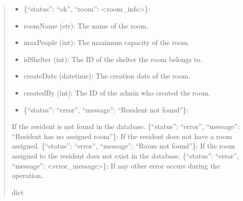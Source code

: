 \documentclass[letterpaper,10pt,english]{sphinxmanual}
\begin{document}
\begin{fulllineitems}
\begin{fulllineitems}
\begin{quote}
\begin{description}
\begin{itemize}
\end{itemize}

\sphinxAtStartPar
\begin{description}
\begin{itemize}
\item {} 
\sphinxAtStartPar
\{“status”: “ok”, “room”: <room\_info>\}:

\end{itemize}
\begin{description}
\begin{itemize}
\item {} 
\sphinxAtStartPar
roomName (str): The name of the room.

\item {} 
\sphinxAtStartPar
maxPeople (int): The maximum capacity of the room.

\item {} 
\sphinxAtStartPar
idShelter (int): The ID of the shelter the room belongs to.

\item {} 
\sphinxAtStartPar
createDate (datetime): The creation date of the room.

\item {} 
\sphinxAtStartPar
createdBy (int): The ID of the admin who created the room.

\end{itemize}

\end{description}
\begin{itemize}
\item {} 
\sphinxAtStartPar
\{“status”: “error”, “message”: “Resident not found”\}:

\end{itemize}

\sphinxAtStartPar
If the resident is not found in the database.
\sphinxhyphen{} \{“status”: “error”, “message”: “Resident has no assigned room”\}:
If the resident does not have a room assigned.
\sphinxhyphen{} \{“status”: “error”, “message”: “Room not found”\}:
If the room assigned to the resident does not exist in the database.
\sphinxhyphen{} \{“status”: “error”, “message”: <error\_message>\}:
If any other error occurs during the operation.

\end{description}


\sphinxAtStartPar
dict


\end{description}
\end{quote}
\end{fulllineitems}
\end{fulllineitems}
\end{document}
